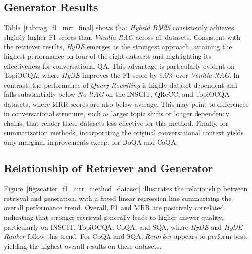 \documentclass[11pt]{article}
\begin{document}
\subsection{Generator Results}\label{subsec:generator_analysis}
Table~\ref{tab:rag_f1_mrr_final} shows that \textit{Hybrid BM25} consistently achieves slightly higher F1 scores than \textit{Vanilla RAG} across all datasets. Consistent with the retriever results, \textit{HyDE} emerges as the strongest approach, attaining the highest performance on four of the eight datasets and highlighting its effectiveness for conversational QA. This advantage is particularly evident on TopiOCQA, where \textit{HyDE} improves the F1 score by 9.6\% over \textit{Vanilla RAG}. In contrast, the performance of \textit{Query Rewriting} is highly dataset-dependent and falls substantially below \textit{No RAG} on the INSCIT, QReCC, and TopiOCQA datasets, where MRR scores are also below average. This may point to differences in conversational structure, such as larger topic shifts or longer dependency chains, that render these datasets less effective for this method. Finally, for summarization methods, incorporating the original conversational context yields only marginal improvements except for DoQA and CoQA.

\subsection{Relationship of Retriever and Generator}\label{subsec:interaction}


Figure~\ref{fig:scatter_f1_mrr_method_dataset} illustrates the relationship between retrieval and generation, with a fitted linear regression line summarizing the overall performance trend. Overall, F1 and MRR are positively correlated, indicating that stronger retrieval generally leads to higher answer quality, particularly on INSCIT, TopiOCQA, CoQA, and SQA, where \textit{HyDE} and \textit{HyDE Ranker} follow this trend. For CoQA and SQA, \textit{Reranker} appears to perform best, yielding the highest overall results on these datasets.
\end{document}
